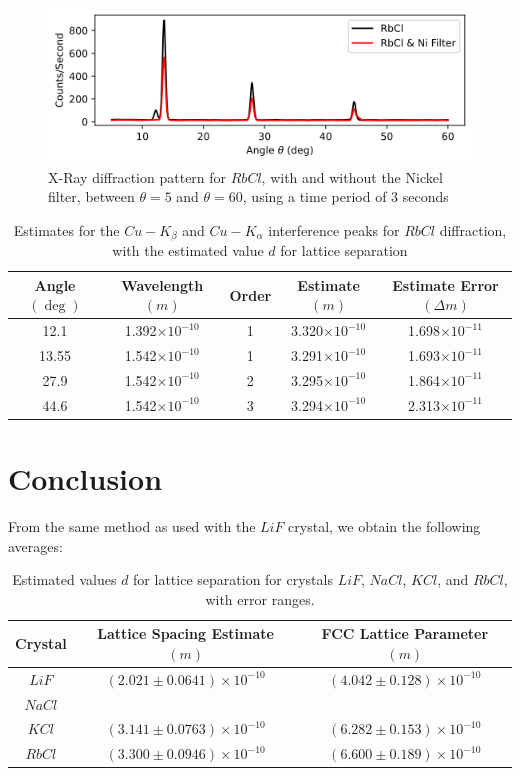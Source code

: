 \documentclass[a4paper]{article}
\begin{document}
\begin{figure}[h!]
\centerline{\includegraphics[scale=0.8]{rbcl.png}}
\caption{X-Ray diffraction pattern for $RbCl$, with and without the Nickel filter, between $\theta=5$ and $\theta=60$, using a time period of 3 seconds}
\label{fig:rbcl}
\end{figure}

\begin{table}[h!]
\centering
\begin{tabular}{ccccc}
\hline
Angle $(\deg)$ & Wavelength $(m)$ & Order & Estimate $(m)$ & Estimate Error $(\Delta m)$\\ \hline
12.1 & 1.392$\times10^{-10}$ & 1 & 3.320$\times10^{-10}$ & 1.698$\times10^{-11}$ \\
13.55 & 1.542$\times10^{-10}$ & 1 & 3.291$\times10^{-10}$ & 1.693$\times10^{-11}$ \\
27.9 & 1.542$\times10^{-10}$ & 2 & 3.295$\times10^{-10}$ & 1.864$\times10^{-11}$ \\
44.6 & 1.542$\times10^{-10}$ & 3 & 3.294$\times10^{-10}$ & 2.313$\times10^{-11}$ \\
\end{tabular}
\caption{\label{tab:rbcl}Estimates for the $Cu-K_\beta$ and $Cu-K_\alpha$ interference peaks for $RbCl$ diffraction, with the estimated value $d$ for lattice separation}
\end{table}
\newpage
\section{Conclusion}
From the same method as used with the $LiF$ crystal, we obtain the following averages:

\begin{table}[h!]
\centering
\begin{tabular}{ccc}
\hline
Crystal & Lattice Spacing Estimate $(m)$ & FCC Lattice Parameter $(m)$ \\ \hline
$LiF$ & $(2.021\pm0.0641)\times10^{-10}$ & $(4.042\pm0.128)\times10^{-10}$ \\
$NaCl$ & \\
$KCl$ & $(3.141\pm0.0763)\times10^{-10}$ & $(6.282\pm0.153)\times10^{-10}$ \\
$RbCl$ & $(3.300\pm0.0946)\times10^{-10}$ & $(6.600\pm0.189)\times10^{-10}$ \\
\end{tabular}
\caption{\label{tab:results}Estimated values $d$ for lattice separation for crystals $LiF$, $NaCl$, $KCl$, and $RbCl$, with error ranges.}
\end{table}
\end{document}
